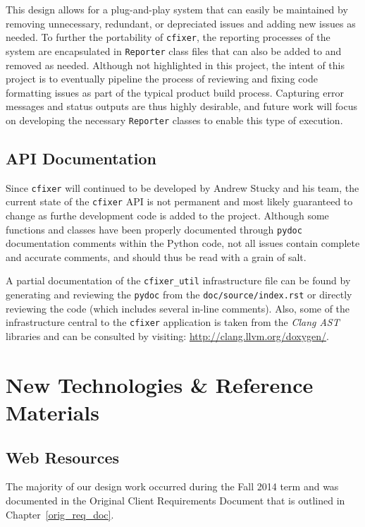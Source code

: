 \documentclass[11pt]{scrreprt}
\begin{document}
This design allows for a plug-and-play system that can easily be maintained by removing unnecessary, redundant, or depreciated issues and adding new issues as needed.
To further the portability of \texttt{cfixer}, the reporting processes of the system are encapsulated in \texttt{Reporter} class files that can also be added to and removed as needed.
Although not highlighted in this project, the intent of this project is to eventually pipeline the process of reviewing and fixing code formatting issues as part of the typical product build process.
Capturing error messages and status outputs are thus highly desirable, and future work will focus on developing the necessary \texttt{Reporter} classes to enable this type of execution.

\section{API Documentation}
Since \texttt{cfixer} will continued to be developed by Andrew Stucky and his team, the current state of the \texttt{cfixer} API is not permanent and most likely guaranteed to change as furthe development code is added to the project.
Although some functions and classes have been properly documented through \texttt{pydoc} documentation comments within the Python code, not all issues contain complete and accurate comments, and should thus be read with a grain of salt.

A partial documentation of the \texttt{cfixer\_util} infrastructure file can be found by generating and reviewing the \texttt{pydoc} from the \texttt{doc/source/index.rst} or directly reviewing the code (which includes several in-line comments).
Also, some of the infrastructure central to the \texttt{cfixer} application is taken from the \textit{Clang AST} libraries and can be consulted by visiting:
\url{http://clang.llvm.org/doxygen/}.

\chapter{New Technologies \& Reference Materials}

\section{Web Resources}
The majority of our design work occurred during the Fall 2014 term and was documented in the Original Client Requirements Document that is outlined in Chapter~\ref{orig_req_doc}.
\end{document}
